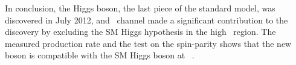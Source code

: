 In conclusion, the Higgs boson, the last piece of the standard model, 
was discovered in July 2012, and \hww\ channel made a significant contribution 
to the discovery by excluding the SM Higgs hypothesis in the high \mHi\ region. 
The measured production rate and the test on the spin-parity shows 
that the new boson is compatible with the SM Higgs boson at ~\GeV.  
